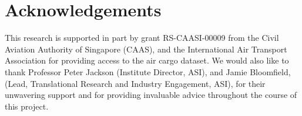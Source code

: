 \documentclass{article}
\begin{document}
\section*{Acknowledgements}
This research is supported in part by grant RS-CAASI-00009 from the Civil Aviation Authority of Singapore (CAAS), and the International Air Transport Association for providing access to the air cargo dataset. We would also like to thank Professor Peter Jackson (Institute Director, ASI), and Jamie Bloomfield, (Lead, Translational Research and Industry Engagement, ASI), for their unwavering support and for providing invaluable advice throughout the course of this project. 



\end{document}
